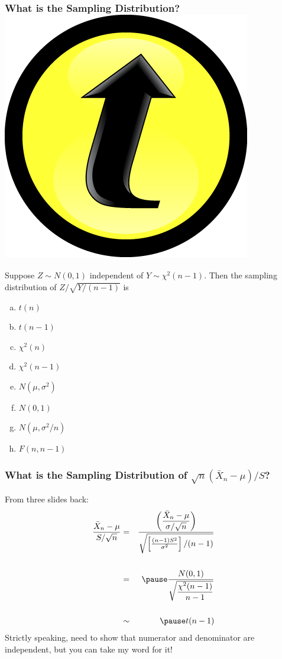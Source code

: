 \documentclass[handout]{beamer}
\begin{document}
\begin{frame}[c]\frametitle{What is the Sampling Distribution? \hfill \includegraphics[scale = 0.05]{./images/clicker}}
    
Suppose $Z\sim N(0,1)$ independent of $Y \sim \chi^2(n-1)$. Then the sampling distribution of \alert{$Z/\sqrt{Y/(n-1)}$} is

    \begin{enumerate}[(a)]
    	\item $t(n)$
    	\item $t(n-1)$
    	\item $\chi^2(n)$
    	\item $\chi^2(n-1)$
    	\item $N(\mu, \sigma^2)$
    	\item $N(0,1)$
    	\item $N(\mu, \sigma^2/n)$
    	\item $F(n, n-1)$
    \end{enumerate}



\end{frame}
\begin{frame}
\frametitle{What is the Sampling Distribution of $\sqrt{n}(\bar{X}_n-\mu)/S$?}
From three slides back:
\begin{eqnarray*}
	\frac{\bar{X}_n - \mu}{S/\sqrt{n}} &=& \frac{\displaystyle \left(\frac{\bar{X}_n - \mu}{\sigma/\sqrt{n}}\right)}{\sqrt{\left[\frac{(n-1)S^2}{\sigma^2}\right]/(n-1)}} \\ \\ 
		&=&\pause \frac{N(0,1)}{\sqrt{\displaystyle\frac{\chi^2(n-1)}{n-1}}}\\ \\ 
		&\sim& \pause t(n-1)
\end{eqnarray*}
\pause
\alert{Strictly speaking, need to show that numerator and denominator are independent, but you can take my word for it!}
\end{frame}
\end{document}

